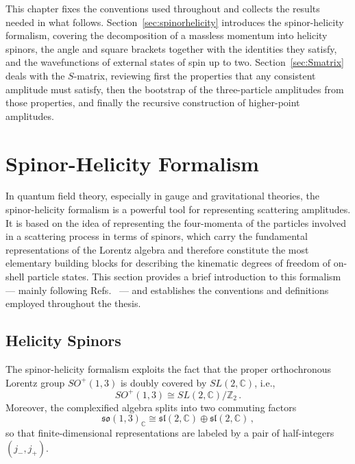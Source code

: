 This chapter fixes the conventions used throughout and collects the results needed in what follows.
Section~\ref{sec:spinorhelicity} introduces the spinor-helicity formalism, covering the
decomposition of a massless momentum into helicity spinors, the angle and square brackets together
with the identities they satisfy, and the wavefunctions of external states of spin up to two.
Section~\ref{sec:Smatrix} deals with the $S$-matrix, reviewing first the properties that any
consistent amplitude must satisfy, then the bootstrap of the three-particle amplitudes from those
properties, and finally the recursive construction of higher-point amplitudes.

\section{Spinor-Helicity Formalism\label{sec:spinorhelicity}}

In quantum field theory, especially in gauge and gravitational theories,
the spinor-helicity formalism is a powerful tool for representing scattering amplitudes.
It is based on the idea of representing the four-momenta of the particles involved in a
scattering process in terms of spinors, which carry the fundamental representations of the
Lorentz algebra and therefore constitute the most elementary building blocks for describing the
kinematic degrees of freedom of on-shell particle states.
This section provides a brief introduction to this formalism --- mainly following Refs.~\cite{Badger:2023eqz,Henn:2014yza,Brandhuber:2022qbk} --- and establishes the conventions and definitions employed throughout the thesis.

\subsection{Helicity Spinors}

The spinor-helicity formalism exploits the fact that the proper orthochronous Lorentz group $SO^+(1,3)$ is
doubly covered by $SL(2,\mathbb C)$, i.e.,
\begin{equation}
    SO^+(1,3) \cong SL(2,\mathbb C)/\mathbb Z_2\,.
\end{equation}
Moreover, the complexified algebra splits into two commuting factors
\begin{equation}
    \mathfrak{so}(1,3)_{\mathbb C}\cong\mathfrak{sl}(2,\mathbb C)\oplus\mathfrak{sl}(2,\mathbb C)\,,
\end{equation}
so that finite-dimensional representations are labeled by a pair of half-integers $(j_-,j_+)$.

